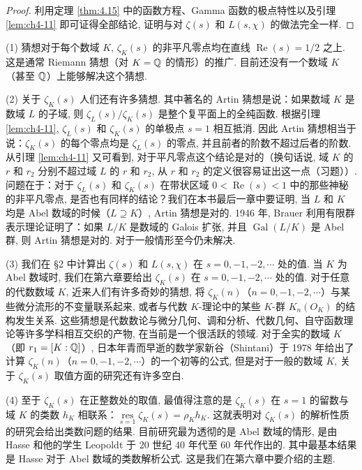 \begin{proof}
利用定理 \ref{thm:4.15} 中的函数方程、Gamma 函数的极点特性以及引理 \ref{lem:ch4-11} 即可证得全部结论, 证明与对 $\zeta(s)$ 和 $L(s,\chi)$ 的做法完全一样. 
\end{proof}

\begin{remark}
(1) 猜想对于每个数域 $K$, $\zeta_K(s)$ 的非平凡零点均在直线 $\operatorname{Re}(s)=1/2$ 之上. 这是通常 Riemann 猜想（对 $K=\mathbb{Q}$ 的情形）的推广. 目前还没有一个数域 $K$（甚至 $\mathbb{Q}$）上能够解决这个猜想. 

(2) 关于 $\zeta_K(s)$ 人们还有许多猜想. 其中著名的 Artin 猜想是说：如果数域 $K$ 是数域 $L$ 的子域, 则 $\zeta_L(s)/\zeta_K(s)$ 是整个复平面上的全纯函数. 根据引理 \ref{lem:ch4-11}, $\zeta_L(s)$ 和 $\zeta_K(s)$ 的单极点 $s=1$ 相互抵消. 因此 Artin 猜想相当于说：$\zeta_K(s)$ 的每个零点均是 $\zeta_L(s)$ 的零点, 并且前者的阶数不超过后者的阶数. 从引理 \ref{lem:ch4-11} 又可看到, 对于平凡零点这个结论是对的（换句话说, 域 $K$ 的 $r$ 和 $r_2$ 分别不超过域 $L$ 的 $r$ 和 $r_2$, 从 $r$ 和 $r_2$ 的定义很容易证出这一点（习题））. 问题在于：对于 $\zeta_L(s)$ 和 $\zeta_K(s)$ 在带状区域 $0<\operatorname{Re}(s)<1$ 中的那些神秘的非平凡零点, 是否也有同样的结论？我们在本书最后一章中要证明, 当 $L$ 和 $K$ 均是 Abel 数域的时候（$L\supseteq K$）, Artin 猜想是对的. 1946 年, Brauer 利用有限群表示理论证明了：如果 $L/K$ 是数域的 Galois 扩张, 并且 $\operatorname{Gal}(L/K)$ 是 Abel 群, 则 Artin 猜想是对的. 对于一般情形至今仍未解决. 

(3) 我们在 §2 中计算出 $\zeta(s)$ 和 $L(s,\chi)$ 在 $s=0,-1,-2,\cdots$ 处的值. 当 $K$ 为 Abel 数域时, 我们在第六章要给出 $\zeta_K(s)$ 在 $s=0,-1,-2,\cdots$ 处的值. 对于任意的代数数域 $K$, 近来人们有许多奇妙的猜想, 将 $\zeta_K(n)$（$n=0,-1,-2,\cdots$）与某些微分流形的不变量联系起来, 或者与代数 $K$-理论中的某些 $K$-群 $K_n(O_K)$ 的结构发生关系. 这些猜想是代数数论与微分几何、调和分析、代数几何、自守函数理论等许多学科相互交织的产物, 在当前是一个很活跃的领域. 对于全实的数域 $K$（即 $r_1=[K:\mathbb{Q}]$）, 日本年青而早逝的数学家新谷（Shintani）于 1978 年给出了计算 $\zeta_K(n)$（$n=0,-1,-2,\cdots$）的一个初等的公式, 但是对于一般的数域 $K$, 关于 $\zeta_K(s)$ 取值方面的研究还有许多空白. 

(4) 至于 $\zeta_K(s)$ 在正整数处的取值, 最值得注意的是 $\zeta_K(s)$ 在 $s=1$ 的留数与域 $K$ 的类数 $h_K$ 相联系：$\underset{s=1}{\operatorname{res}}\zeta_K(s)=\rho_Kh_K$. 这就表明对 $\zeta_K(s)$ 的解析性质的研究会给出类数问题的结果. 目前研究最为透彻的是 Abel 数域的情形, 是由 Hasse 和他的学生 Leopoldt 于 20 世纪 40 年代至 60 年代作出的. 其中最基本结果是 Hasse 对于 Abel 数域的类数解析公式. 这是我们在第六章中要介绍的主题. 
\end{remark}


